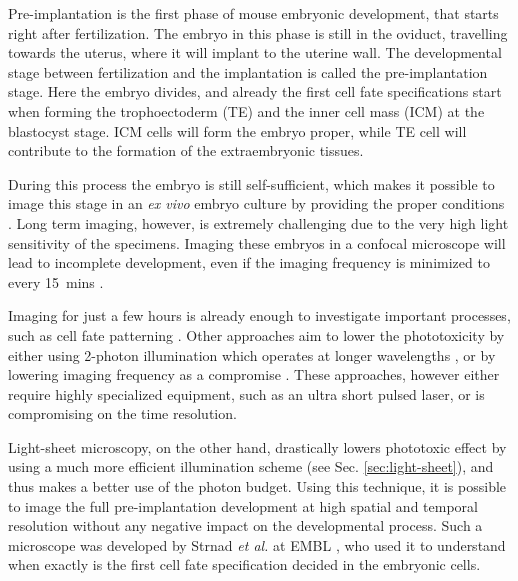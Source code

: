     Pre-implantation is the first phase of mouse embryonic development, that starts right after fertilization. The embryo in this phase is still in the oviduct, travelling towards the uterus, where it will implant to the uterine wall. The developmental stage between fertilization and the implantation is called the pre-implantation stage. Here the embryo divides, and already the first cell fate specifications start when forming the trophoectoderm (TE) and the inner cell mass (ICM) at the blastocyst stage. ICM cells will form the embryo proper, while TE cell will contribute to the formation of the extraembryonic tissues.
    
    During this process the embryo is still self-sufficient, which makes it possible to image this stage in an \textit{ex vivo} embryo culture by providing the proper conditions \cite{doherty_culture_2000}. Long term imaging, however, is extremely challenging due to the very high light sensitivity of the specimens. Imaging these embryos in a confocal microscope will lead to incomplete development, even if the imaging frequency is minimized to every \SI{15}{mins} \cite{strnad_inverted_2016}.

    Imaging for just a few hours is already enough to investigate important processes, such as cell fate patterning \cite{dietrich_stochastic_2007}. Other approaches aim to lower the phototoxicity by either using 2-photon illumination which operates at longer wavelengths \cite{denk_two-photon_1990,squirrell_long-term_1999,mcdole_lineage_2011}, or by lowering imaging frequency as a compromise \cite{yamagata_long-term_2009}. These approaches, however either require highly specialized equipment, such as an ultra short pulsed laser, or is compromising on the time resolution.

    Light-sheet microscopy, on the other hand, drastically lowers phototoxic effect by using a much more efficient illumination scheme (see Sec. \ref{sec:light-sheet}), and thus makes a better use of the photon budget. Using this technique, it is possible to image the full pre-implantation development at high spatial and temporal resolution without any negative impact on the developmental process. Such a microscope was developed by Strnad \textit{et al.} at EMBL \cite{strnad_inverted_2016}, who used it to understand when exactly is the first cell fate specification decided in the embryonic cells.

